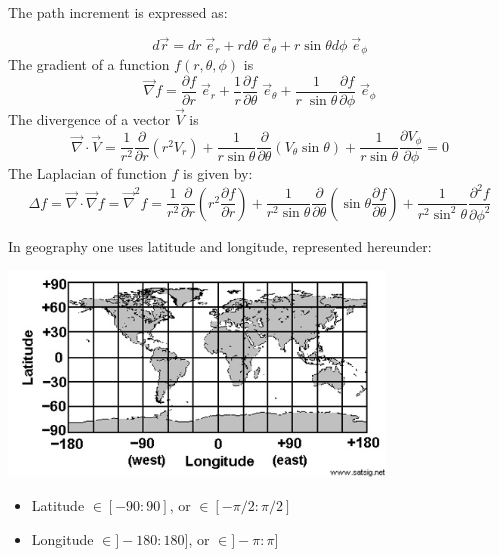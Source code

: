 The path increment is expressed as:

\begin{equation}
d\vec{r} = dr \; \vec{e}_r + r d\theta \; \vec{e}_\theta + r \sin\theta d\phi \; \vec{e}_\phi
\end{equation}
The gradient of a function $f(r,\theta,\phi)$ is 
\begin{equation}
\vec\nabla f= \frac{\partial f}{\partial r} \; \vec{e}_r
+ \frac{1}{r} \frac{\partial f}{\partial \theta} \; \vec{e}_\theta 
+ \frac{1}{r \; \sin\theta} \frac{\partial f}{\partial \phi} \;  \vec{e}_\phi
\end{equation}
The divergence of a vector $\vec{V}$ is
\begin{equation}
\vec\nabla\cdot \vec{V}=
\frac{1}{r^2} \frac{\partial}{\partial r} \left(r^2 V_r \right) 
+
\frac{1}{r \sin\theta} \frac{\partial}{\partial \theta} (V_\theta \sin\theta)
+
\frac{1}{r \sin\theta} \frac{\partial V_\phi}{\partial \phi}=0
\label{eq:divsc}
\end{equation}
The Laplacian of function $f$ is given by: 
\begin{equation}
\Delta f= \vec\nabla \cdot\vec\nabla f= \vec\nabla^2 f
=
\frac{1}{r^2}\frac{\partial}{\partial r} \left( r^2 \frac{\partial f}{\partial r} \right)
+\frac{1}{r^2 \sin\theta} \frac{\partial}{\partial \theta} \left( \sin\theta \frac{\partial f}{\partial \theta} \right)
+\frac{1}{r^2 \sin^2\theta}  \frac{\partial^2 f}{\partial \phi^2}
\end{equation}

In geography one uses latitude and longitude, represented hereunder:
\begin{center}
\includegraphics[width=10cm]{images/map.jpg}
\end{center}
\begin{itemize}
\item Latitude  $\in[-90:90]$,   or $\in[-\pi/2:\pi/2]$ 
\item Longitude $\in]-180:180]$, or $\in]-\pi:\pi]$ 
\end{itemize}

